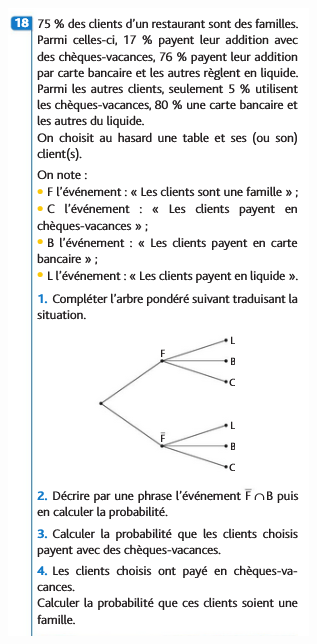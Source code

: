 \documentclass{article}
\begin{document}
\begin{center}
\begin{minipage}{0.45\textwidth}
\includegraphics[width=\textwidth]{Exercice_2.png}
\end{minipage}
\end{center}
\end{document}

